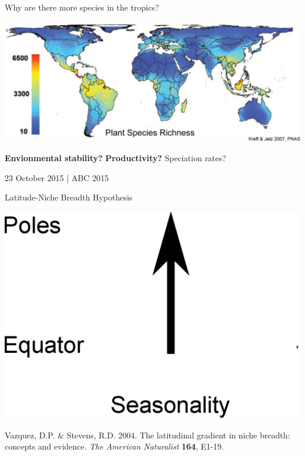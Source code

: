 \documentclass{beamer}
\begin{document}
  \begin{frame}{Why are there more species in the tropics?}

    \begin{center}
      \includegraphics*[width=.8\textwidth]{Figures/plant_richness.eps}


      \vspace{1cm}

      \textbf{Envionmental stability?} 
      \textbf{Productivity?} 
      Speciation rates?

      \vspace{1cm}
      {\color{white} 23 October 2015 | ABC 2015}

    \end{center}
  \end{frame}


  \begin{frame}{Latitude-Niche Breadth Hypothesis}

    \begin{center}
      \includegraphics[width=.8\textwidth]{Figures/latitude_niche_breadth_1.eps}
    \end{center}

    \footnotesize{Vazquez, D.P. \& Stevens, R.D. 2004. The latitudinal gradient in niche breadth: concepts and evidence. \emph{The American Naturalist} \textbf{164}, E1-19.}
  \end{frame}
\end{document}
